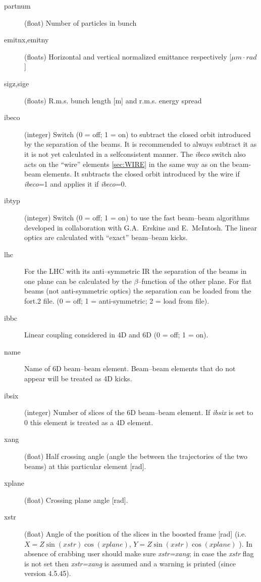 \begin{description}
\item [partnum] (float) Number of particles in bunch
\item [emitnx,emitny] (floats) Horizontal and vertical normalized
  emittance respectively [$\mu m\cdot rad$]
\item [sigz,sige] (floats) R.m.s. bunch length [m] and r.m.s. energy
  spread
\item [ibeco] (integer) Switch (0 = off; 1 = on) to subtract the
  closed orbit introduced by the separation of the beams. It is
  recommended to always subtract it as it is not yet calculated in a
  selfconsistent manner. The \emph{ibeco} switch also acts on the ``wire'' elements \ref{sec:WIRE} in the same way as on the beam-beam elements. It subtracts the closed orbit introduced by the wire if \emph{ibeco}=1 and applies it if \emph{ibeco}=0.
\item [ibtyp] (integer) Switch (0 = off; 1 = on) to use the fast
  beam--beam algorithms developed in collaboration with G.A.~Erskine
  and E.~McIntosh.  The linear optics are calculated with ``exact''
  beam--beam kicks.
\item [lhc] For the LHC with its anti--symmetric IR the separation of
  the beams in one plane can be calculated by the $\beta$--function of
  the other plane. For flat beams (not anti-symmetric optics) the separation
  can be loaded from the fort.2 file. (0 = off; 1 = anti-symmetric; 2 = load from file).
\item [ibbc] Linear coupling considered in 4D and 6D (0 = off; 1 = on).
\item [name] Name of 6D beam--beam element. Beam--beam elements that
  do not appear will be treated as 4D kicks.
\item [ibsix] (integer) Number of slices of the 6D beam--beam element.
  If {\it ibsix} is set to 0 this element is treated as a 4D element.
\item [xang] (float) Half crossing angle (angle the between the trajectories of the two beams) at this particular element [rad].
\item [xplane] (float) Crossing plane angle [rad].
\item [xstr] (float) Angle of the position of the slices in the boosted frame [rad] (i.e. $X = Z \sin(\mathit{xstr}) \cos(\mathit{xplane})$, $Y =Z \sin(\mathit{xstr}) \cos(\mathit{xplane})$ ).
  In absence of crabbing user should make sure \textit{xstr=xang}; in case the \textit{xstr} flag is not set then \textit{xstr=xang} is assumed and a warning is printed (since version 4.5.45).
\end{description}

